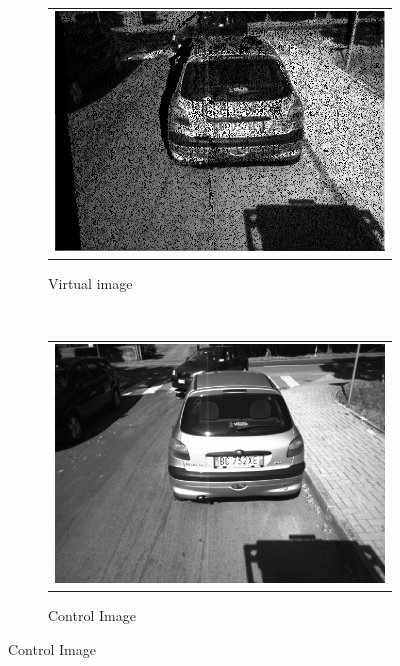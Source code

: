 \begin{figure}[h!]
        \centering
        \begin{subfigure}[b]{0.3\textwidth}
	  \begin{tabular}{c}
	    \includegraphics[width=\textwidth]{reprojection}
	  \end{tabular}
	  \caption{Virtual image}\label{fig:cp03_ncc_virtual_img}
        \end{subfigure}%
        ~
        \begin{subfigure}[b]{0.3\textwidth}
	  \begin{tabular}{c}
	    \includegraphics[width=\textwidth]{leftNCC}
	  \end{tabular}
	  \caption{Control Image}\label{fig:cp03_ncc_control_img}
        \end{subfigure}%

\end{figure}
